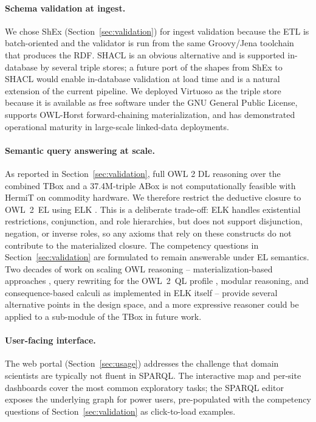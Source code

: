 \paragraph{Schema validation at ingest.} We chose ShEx
(Section~\ref{sec:validation}) for ingest validation because the
ETL is batch-oriented and the validator is run from the same
Groovy/Jena toolchain that produces the RDF. SHACL is an obvious
alternative and is supported in-database by several triple stores;
a future port of the shapes from ShEx to SHACL would enable
in-database validation at load time and is a natural extension of
the current pipeline. We deployed Virtuoso as the triple store
because it is available as free software under the GNU General
Public License, supports OWL-Horst forward-chaining
materialization, and has demonstrated operational maturity in
large-scale linked-data deployments.

\paragraph{Semantic query answering at scale.} As reported in
Section~\ref{sec:validation}, full OWL 2 DL reasoning over the
combined TBox and a 37.4M-triple ABox is not computationally
feasible with HermiT on commodity hardware. We therefore restrict
the deductive closure to OWL~2~EL using ELK \cite{elk}. This is a
deliberate trade-off: ELK handles existential restrictions,
conjunction, and role hierarchies, but does not support
disjunction, negation, or inverse roles, so any axioms that rely
on these constructs do not contribute to the materialized closure.
The competency questions in Section~\ref{sec:validation} are
formulated to remain answerable under EL semantics. Two decades of
work on scaling OWL reasoning -- materialization-based approaches
\cite{owlhorst}, query rewriting for the OWL~2~QL profile
\cite{owl2profiles}, modular reasoning, and consequence-based
calculi as implemented in ELK itself -- provide several alternative
points in the design space, and a more expressive reasoner could
be applied to a sub-module of the TBox in future work.

\paragraph{User-facing interface.} The web portal
(Section~\ref{sec:usage}) addresses the challenge that domain
scientists are typically not fluent in SPARQL. The interactive map
and per-site dashboards cover the most common exploratory tasks;
the SPARQL editor exposes the underlying graph for power users,
pre-populated with the competency questions of
Section~\ref{sec:validation} as click-to-load examples.

